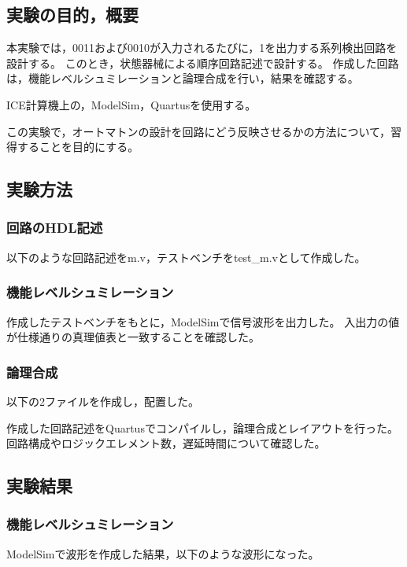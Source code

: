 
\subsection{実験の目的，概要}
本実験では，0011および0010が入力されるたびに，1を出力する系列検出回路を設計する。
このとき，状態器械による順序回路記述で設計する。
作成した回路は，機能レベルシュミレーションと論理合成を行い，結果を確認する。

ICE計算機上の，ModelSim，Quartusを使用する。

この実験で，オートマトンの設計を回路にどう反映させるかの方法について，習得することを目的にする。

\subsection{実験方法}
\subsubsection{回路のHDL記述}
以下のような回路記述をm.v，テストベンチをtest\_m.vとして作成した。



\subsubsection{機能レベルシュミレーション}
作成したテストベンチをもとに，ModelSimで信号波形を出力した。
入出力の値が仕様通りの真理値表と一致することを確認した。

\subsubsection{論理合成}
以下の2ファイルを作成し，配置した。



作成した回路記述をQuartusでコンパイルし，論理合成とレイアウトを行った。
回路構成やロジックエレメント数，遅延時間について確認した。

\subsection{実験結果}
\subsubsection{機能レベルシュミレーション}
ModelSimで波形を作成した結果，以下のような波形になった。

